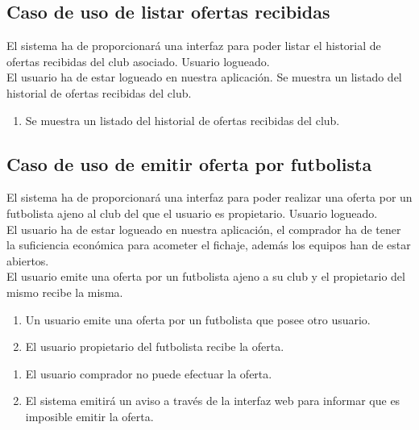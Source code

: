 \subsection{Caso de uso de listar ofertas recibidas}
 El sistema ha de proporcionará una interfaz
para poder listar el historial de ofertas recibidas del club asociado.
 Usuario logueado. \\
 El usuario ha de estar logueado en
nuestra aplicación.
 Se muestra un listado del historial de
ofertas recibidas del club.
\begin{enumerate}
  \item Se muestra un listado del historial de ofertas recibidas del club.
\end{enumerate}

\subsection{Caso de uso de emitir oferta por futbolista}
 El sistema ha de proporcionará una interfaz
para poder realizar una oferta por un futbolista ajeno al club del que
el usuario es propietario.
 Usuario logueado. \\
 El usuario ha de estar logueado en
nuestra aplicación, el comprador ha de tener la suficiencia económica
para acometer el fichaje, además los equipos han de estar abiertos. \\
 El usuario emite una oferta por un
futbolista ajeno a su club y el propietario del mismo recibe la misma.
\begin{enumerate}
  \item Un usuario emite una oferta por un futbolista que posee
    otro usuario.
  \item El usuario propietario del futbolista recibe la oferta.
\end{enumerate}
\begin{enumerate}
  \item El usuario comprador no puede efectuar la oferta.
  \item El sistema emitirá un aviso a través de la interfaz web para
    informar que es imposible emitir la oferta.
\end{enumerate}

